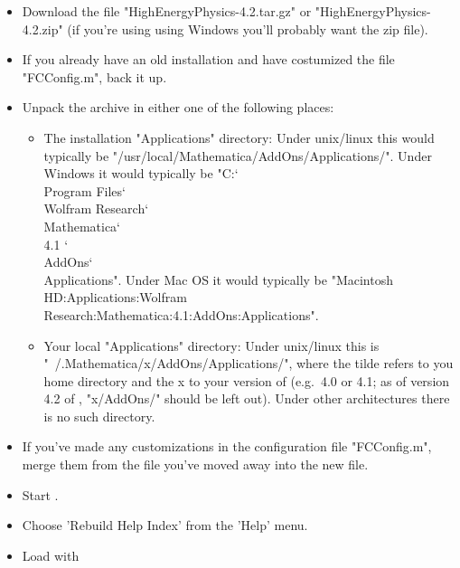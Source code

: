\begin{itemize}

\item{Download the file "HighEnergyPhysics-4.2.tar.gz" or "HighEnergyPhysics-4.2.zip" (if you're using using Windows you'll probably want the zip file).}

\item{If you already have an old installation and have costumized the file "FCConfig.m", back it up.}

\item{Unpack the archive in either one of the following places:
\begin{itemize}
\item The \mma installation "Applications" directory: Under {\sc unix}/{\sc linux} this would typically be "/usr/local/Mathematica/AddOns/Applications/". Under Windows it would typically be "C:\char`\\Program Files\char`\\Wolfram Research\char`\\Mathematica\char`\\4.1 \char`\\AddOns\char`\\Applications". Under {\sc Mac OS} it would typically be "Macintosh HD:Applications:Wolfram Research:Mathematica:4.1:AddOns:Applications".
\item Your local "Applications" directory: Under {\sc unix}/{\sc linux} this is "~/.Mathematica/x/AddOns/Applications/", where the tilde refers to you home directory and the x to your version of \mma (e.g.~4.0 or 4.1; as of version 4.2 of \mma, "x/AddOns/" should be left out). Under other architectures there is no such directory.
\end{itemize}}

\item{If you've made any customizations in the configuration file "FCConfig.m", merge them from the file you've moved away into the new file.}

\item{Start \mma.}

\item{Choose 'Rebuild Help Index' from the 'Help' menu.}

\item Load \fc with 

\end{itemize}

